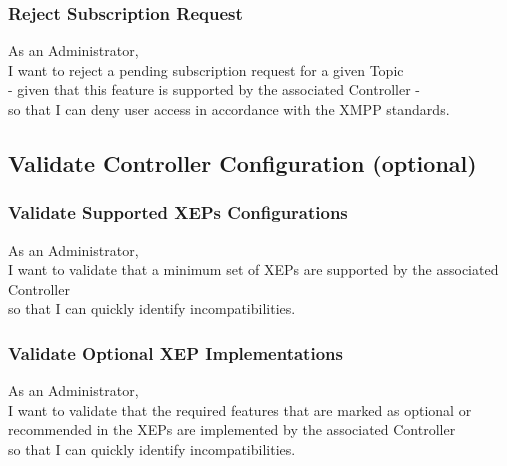 \subsubsection{Reject Subscription Request}

As an Administrator,\\
I want to reject a pending subscription request for a given Topic\\
- given that this feature is supported by the associated Controller -\\
so that I can deny user access in accordance with the XMPP standards.

\subsection{Validate Controller Configuration (optional)}

\subsubsection{Validate Supported XEPs Configurations}
As an Administrator,\\
I want to validate that a minimum set of XEPs are supported by the associated Controller\\
so that I can quickly identify incompatibilities.

\subsubsection{Validate Optional XEP Implementations}
As an Administrator,\\
I want to validate that the required features that are marked as optional or recommended in the XEPs are implemented by the associated Controller\\
so that I can quickly identify incompatibilities.

